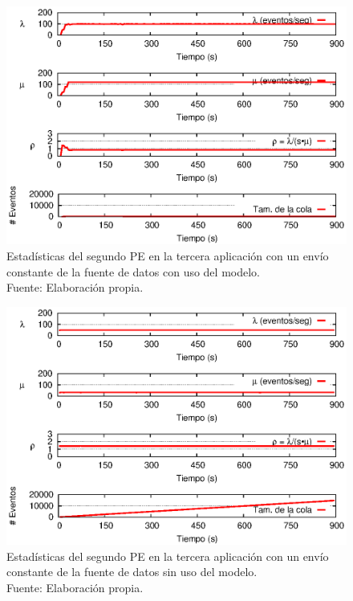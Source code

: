\begin{figure}[!htp]
    \centering
    \captionsetup{justification=centering}
	\includegraphics[scale=1]{images/exp/app3/cm/logical/statusTwoPE.eps}
    \caption[Estadísticas del segundo PE en la tercera aplicación con un envío constante de la fuente de datos con uso del modelo.]{Estadísticas del segundo PE en la tercera aplicación con un envío constante de la fuente de datos con uso del modelo.\\Fuente: Elaboración propia.}
    \label{fig:app3-statusTwoPE-cm}
\end{figure}

\begin{figure}[!htp]
    \centering
    \captionsetup{justification=centering}
    \includegraphics[scale=1]{images/exp/app3/sm/logical/statusTwoPE.eps}
    \caption[Estadísticas del segundo PE en la tercera aplicación con un envío constante de la fuente de datos sin uso del modelo.]{Estadísticas del segundo PE en la tercera aplicación con un envío constante de la fuente de datos sin uso del modelo.\\Fuente: Elaboración propia.}
    \label{fig:app3-statusTwoPE-sm}
\end{figure}

